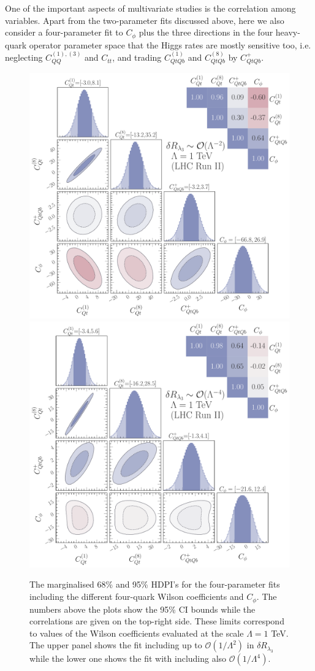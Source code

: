 One of the important aspects of multivariate studies is the correlation among variables. Apart from the two-parameter fits discussed above, here we also consider a four-parameter fit to $C_\phi$ plus the three directions in the four heavy-quark operator parameter space that the Higgs rates are
mostly sensitive too, i.e. neglecting $C_{QQ}^{(1),(3) }$ and $C_{tt}$, and trading $C_{QtQb}^{(1)}$ and $C_{QtQb}^{(8)}$ by $C_{QtQb}^{+}$.
\begin{figure}[t!]
	\begin{center}
		\vspace{-1.5cm}
		\includegraphics[width=.6\linewidth]{fig/4param_fit_LHC_RunII_l3L_rge}\\
		\includegraphics[width=.6\linewidth]{fig/4param_fit_LHC_RunII_l3Q_rge}
		\vspace{-.5cm}
	\end{center}
	\caption{The marginalised 68\% and 95\% HDPI's for the four-parameter fits including the different four-quark Wilson coefficients and $C_\phi$. The numbers above the plots show the 95\% CI bounds while the correlations are given on the top-right side. 
		These limits correspond to values of the Wilson coefficients evaluated at the scale $\Lambda=1$ TeV. 
		The upper panel shows the fit including up to $\mathcal{O}(1/\Lambda^2)$ in $\delta R_{\lambda_3}$  while the lower one shows the fit with including also  $\mathcal{O}(1/\Lambda^4)$.  \label{fig:4param} }
\end{figure}
